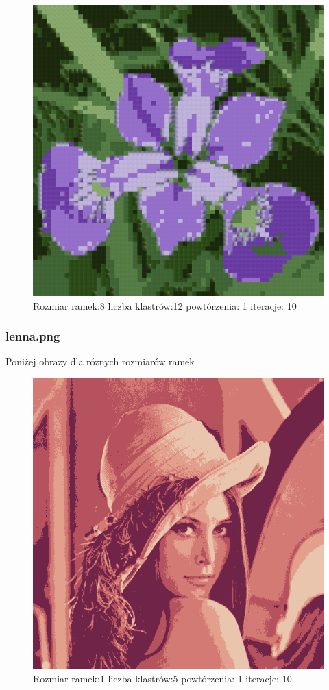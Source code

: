\documentclass{classrep}
\begin{document}
{{{{                    \begin{figure}[!htbp]
                        \centering
                        \includegraphics[width=\textwidth,width=90mm]{obrazy/iris_R8_K12_P1_It10.png}
                        \caption{Rozmiar ramek:8 liczba klastrów:12 powtórzenia: 1 iteracje: 10 }
                    \end{figure}
                    \FloatBarrier
                }

                \subsubsection{lenna.png}
                {
                    Poniżej obrazy dla róznych rozmiarów ramek
                    \begin{figure}[!htbp]
                        \centering
                        \includegraphics[width=\textwidth,width=90mm]{obrazy/lenna_R1_K5_P1_It10.png}
                        \caption{Rozmiar ramek:1 liczba klastrów:5 powtórzenia: 1 iteracje: 10 }
                    \end{figure}

}}}}
\end{document}
